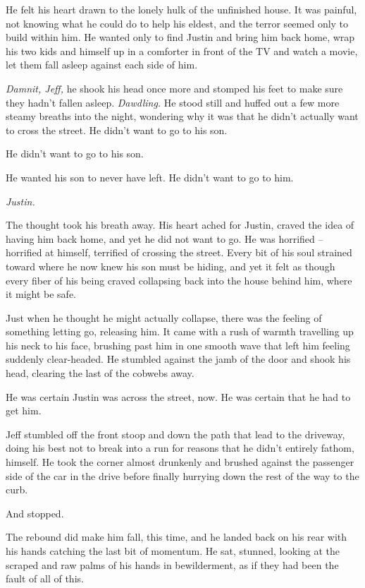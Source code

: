 He felt his heart drawn to the lonely hulk of the unfinished house.  It was painful, not knowing what he could do to help his eldest, and the terror seemed only to build within him.  He wanted only to find Justin and bring him back home, wrap his two kids and himself up in a comforter in front of the TV and watch a movie, let them fall asleep against each side of him.

\textit{Damnit, Jeff,} he shook his head once more and stomped his feet to make sure they hadn't fallen asleep.  \textit{Dawdling.}  He stood still and huffed out a few more steamy breaths into the night, wondering why it was that he didn't actually want to cross the street.  He didn't want to go to his son.

He didn't want to go to his son.

He wanted his son to never have left.  He didn't want to go to him.

\textit{Justin.}

The thought took his breath away.  His heart ached for Justin, craved the idea of having him back home, and yet he did not want to go.  He was horrified -- horrified at himself, terrified of crossing the street.  Every bit of his soul strained toward where he now knew his son must be hiding, and yet it felt as though every fiber of his being craved collapsing back into the house behind him, where it might be safe.

Just when he thought he might actually collapse, there was the feeling of something letting go, releasing him.  It came with a rush of warmth travelling up his neck to his face, brushing past him in one smooth wave that left him feeling suddenly clear-headed.  He stumbled against the jamb of the door and shook his head, clearing the last of the cobwebs away.

He was certain Justin was across the street, now.  He was certain that he had to get him.

\secdiv

Jeff stumbled off the front stoop and down the path that lead to the driveway, doing his best not to break into a run for reasons that he didn't entirely fathom, himself.  He took the corner almost drunkenly and brushed against the passenger side of the car in the drive before finally hurrying down the rest of the way to the curb.

And stopped.

The rebound did make him fall, this time, and he landed back on his rear with his hands catching the last bit of momentum.  He sat, stunned, looking at the scraped and raw palms of his hands in bewilderment, as if they had been the fault of all of this.

